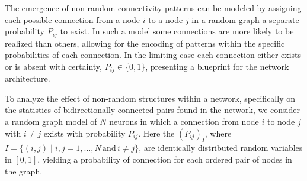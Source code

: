 






The emergence of non-random connectivity patterns can be modeled by
assigning each possible connection from a node $i$ to a node $j$ in a
random graph a separate probability $P_{ij}$ to exist.
%
In such a model some connections are more likely to be realized than
others, allowing for the encoding of patterns within the specific
probabilities of each connection.
%
In the limiting case each connection either exists or is absent with
certainty, $P_{ij} \in \{0,1\}$, presenting a blueprint for the
network architecture.
%

%
To analyze the effect of non-random structures within a network,
specifically on the statistics of bidirectionally connected pairs
found in the network, we consider a random graph model of $N$ neurons
in which a connection from node $i$ to node $j$ with $i \neq j$ exists with
probability $P_{ij}$.
%
Here the $(P_{ij})_{I}$, where  $I = \{(i,j) \mid i,j = 1,\dots,N\, \textrm{and}\, i \neq j\}$, are identically
distributed random variables in $[0,1]$, yielding a probability of
connection for each ordered pair of nodes in the graph. %
%

